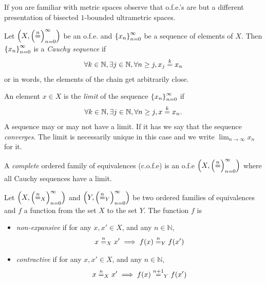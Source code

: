 \documentclass[format=acmsmall, review=true, screen=true]{acmart}
\newcommand{\nequal}[1][n]{\stackrel{\tiny{#1}}{=}}
\newcommand{\nats}{\mathbb{N}}
\begin{document}
If you are familiar with metric spaces observe that o.f.e.'s are but a different
presentation of bisected $1$-bounded ultrametric spaces.

\begin{definition}
  \label{def:cauchy-sequence}
  Let $\left(X, \seqn{\nequal} \right)$ be an o.f.e. and $\left\{x_n\right\}_{n=0}^{\infty}$ be a sequence of
  elements of $X$. Then $\left\{x_n\right\}_{n=0}^{\infty}$ is a \emph{Cauchy sequence} if
  \begin{align*}
    \forall k \in \nats, \exists j \in \nats, \forall n \geq j, x_j \nequal[k] x_n
  \end{align*}
  or in words, the elements of the chain get arbitrarily close.

  An element $x \in X$ is the \emph{limit} of the sequence $\left\{x_n\right\}_{n=0}^{\infty}$ if
  \begin{align*}
    \forall k \in \nats, \exists j \in \nats, \forall n \geq j, x \nequal[k] x_n.
  \end{align*}
  A sequence may or may not have a limit. If it has we say that the sequence
  \emph{converges}. The limit is necessarily unique in this case
  and we write $\lim_{n\to\infty}x_n$ for it.
\end{definition}

\begin{definition}[c.o.f.e.] A \emph{complete} ordered family of equivalences
  (c.o.f.e) is an o.f.e $\left(X, \left( \nequal \right)_{n=0}^\infty \right)$
  where all Cauchy sequences have a limit.  
\end{definition}

\begin{definition}
  \label{def:nonexpansive-contractive-ofe}
  Let $\left(X, \seqn{\nequal_{X}}\right)$ and $\left(Y, \seqn{\nequal_{Y}}\right)$ be
  two ordered families of equivalences and $f$ a function from the set $X$ to the set $Y$.
  The function $f$ is 
  \begin{itemize}
  \item \emph{non-expansive} if for any $x, x' \in X$, and any $n \in \nats$,
    \begin{align*}
      x \nequal_X x' \implies f(x) \nequal_Y f(x')
    \end{align*}
  \item \emph{contractive} if for any $x, x' \in X$, and any $n \in \nats$,
    \begin{align*}
      x \nequal_X x' \implies f(x) \nequal[n+1]_Y f(x')
    \end{align*}
  \end{itemize}
\end{definition}
\end{document}
